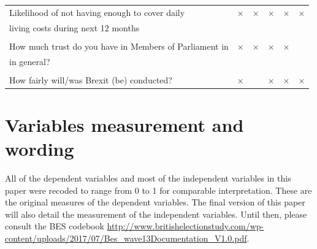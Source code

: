 \documentclass[12pt, letter]{article}
\begin{document}
\begin{center}
\begin{longtable}{llllll}
 \\[-4pt]
Likelihood of not having enough to cover daily  & $\times$ & $\times$ & $\times$ & $\times$ & $\times$ \\ 
living costs during next 12 months &&&&& \\ 
 \\[-4pt]
How much trust do you have in Members of Parliament in & $\times$ & $\times$ & $\times$ & $\times$ &  \\ 
in general? &&&&& \\
 \\[-4pt]
How fairly will/was Brexit (be) conducted? & $\times$ &  & $\times$ & $\times$ & $\times$ \\ 
\toprule[1.5pt]
\end{longtable}
\end{center}

\section{Variables measurement and wording} \label{measurmentwording}

All of the dependent variables and most of the independent variables in this paper were recoded to range from 0 to 1 for comparable interpretation. These are the original measures of the dependent variables. The final version of this paper will also detail the measurement of the independent variables. Until then, please consult the BES codebook \url{http://www.britishelectionstudy.com/wp-content/uploads/2017/07/Bes\_wave13Documentation\_V1.0.pdf}. 
\end{document}
